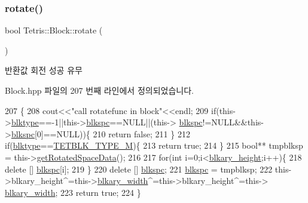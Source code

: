 \subsubsection{\texorpdfstring{rotate()}{rotate()}\hspace{0.1cm}{\footnotesize\ttfamily [2/2]}}
{\footnotesize\ttfamily bool Tetris\+::\+Block\+::rotate (\begin{DoxyParamCaption}{ }\end{DoxyParamCaption})\hspace{0.3cm}{\ttfamily [inline]}}

\begin{DoxyReturn}{반환값}
회전 성공 유무 
\end{DoxyReturn}


Block.\+hpp 파일의 207 번째 라인에서 정의되었습니다.


\begin{DoxyCode}
207                          \{
208                 cout<<\textcolor{stringliteral}{"call rotatefunc in block"}<<endl;
209                 \textcolor{keywordflow}{if}(this->\hyperlink{class_tetris_1_1_block_aceac58dcf8d8afaa82c2bab101cb3cff}{blktype}==-1||this->\hyperlink{class_tetris_1_1_block_af2f96c83a3511d32321672f794aa4db1}{blkspc}==NULL||(this->
      \hyperlink{class_tetris_1_1_block_af2f96c83a3511d32321672f794aa4db1}{blkspc}!=NULL&&this->\hyperlink{class_tetris_1_1_block_af2f96c83a3511d32321672f794aa4db1}{blkspc}[0]==NULL))\{
210                     \textcolor{keywordflow}{return} \textcolor{keyword}{false};
211                 \}
212                 \textcolor{keywordflow}{if}(\hyperlink{class_tetris_1_1_block_aceac58dcf8d8afaa82c2bab101cb3cff}{blktype}==\hyperlink{_block_8hpp_a6da1e2b8848e1a7b5a7ee687fd6492bd}{TETBLK\_TYPE\_M})\{
213                     \textcolor{keywordflow}{return} \textcolor{keyword}{true};
214                 \}
215                 \textcolor{keywordtype}{bool}** tmpblksp = this->\hyperlink{class_tetris_1_1_block_a464ed776185993ad827f316a08969960}{getRotatedSpaceData}();
216 
217                 \textcolor{keywordflow}{for}(\textcolor{keywordtype}{int} i=0;i<\hyperlink{class_tetris_1_1_block_abbea7737c2b1fb7339aab4dff13de27c}{blkary\_height};i++)\{
218                     \textcolor{keyword}{delete} [] \hyperlink{class_tetris_1_1_block_af2f96c83a3511d32321672f794aa4db1}{blkspc}[i];
219                 \}
220                 \textcolor{keyword}{delete} [] \hyperlink{class_tetris_1_1_block_af2f96c83a3511d32321672f794aa4db1}{blkspc};
221                 \hyperlink{class_tetris_1_1_block_af2f96c83a3511d32321672f794aa4db1}{blkspc} = tmpblksp;
222                 this->blkary\_height^=this->\hyperlink{class_tetris_1_1_block_a96548cab58eb788af744b54192c7bea1}{blkary\_width}^=this->blkary\_height^=this->
      \hyperlink{class_tetris_1_1_block_a96548cab58eb788af744b54192c7bea1}{blkary\_width};
223                 \textcolor{keywordflow}{return} \textcolor{keyword}{true};
224             \}
\end{DoxyCode}
\mbox{\label{class_tetris_1_1_block_a1a3fab9e7eabe64a4ba588ed5091d3a9}} 
